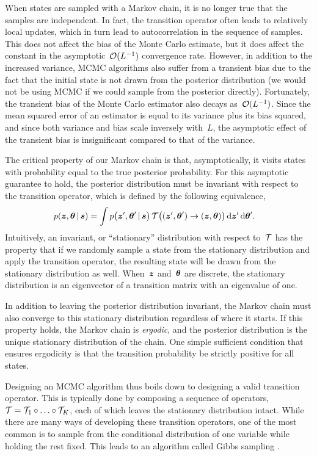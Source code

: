 When states are sampled with a Markov chain, it is no longer true that
the samples are independent. In fact, the transition operator often
leads to relatively local updates, which in turn lead to
autocorrelation in the sequence of samples. This does not affect the
bias of the Monte Carlo estimate, but it does affect the constant in the
asymptotic~$\mathcal{O}(L^{-1})$ convergence rate. However, in addition to
the increased variance, MCMC algorithms also suffer from a transient
bias due to the fact that the initial state is not drawn from the
posterior distribution (we would not be using MCMC if we could sample
from the posterior directly). Fortunately, the transient bias of the
Monte Carlo estimator also decays as~$\mathcal{O}(L^{-1})$. Since the mean
squared error of an estimator is equal to its variance plus its bias
squared, and since both variance and bias scale inversely with~$L$,
the asymptotic effect of the transient bias is insignificant compared
to that of the variance.

The critical property of our Markov chain is that, asymptotically, it
visits states with probability equal to the true posterior
probability.  For this asymptotic guarantee to hold, the posterior
distribution must be invariant with respect to the transition
operator, which is defined by the following equivalence,
\begin{align}
  \label{eq:invariance}
  p(\boldsymbol{z}, \boldsymbol{\theta} \,|\, \boldsymbol{s}) 
  &= \int  p \big(\boldsymbol{z}', \boldsymbol{\theta}' \,|\, \boldsymbol{s} \big) \,
    \mathcal{T} \big((\boldsymbol{z}', \boldsymbol{\theta}') \to (\boldsymbol{z}, \boldsymbol{\theta}) \big) \, 
    \mathrm{d}\boldsymbol{z}' \, \mathrm{d}\boldsymbol{\theta}'. 
\end{align}
Intuitively, an invariant, or ``stationary'' distribution with
respect to~$\mathcal{T}$ has the property that if we randomly sample a state
from the stationary distribution and apply the transition operator,
the resulting state will be drawn from the stationary distribution as
well. When~$\boldsymbol{z}$ and~$\boldsymbol{\theta}$ are discrete, the stationary
distribution is an eigenvector of a transition matrix with an eigenvalue
of one.

In addition to leaving the posterior distribution invariant, the
Markov chain must also converge to this stationary distribution
regardless of where it starts. If this property holds, the Markov
chain is \emph{ergodic}, and the posterior distribution is the unique
stationary distribution of the chain. One simple sufficient condition
that ensures ergodicity is that the transition probability be strictly
positive for all states.

Designing an MCMC algorithm thus boils down to designing a valid
transition operator. This is typically done by composing a sequence of
operators,~${\mathcal{T} = \mathcal{T}_1 \circ \ldots \circ \mathcal{T}_K}$, each of which
leaves the stationary distribution intact. While there are many ways
of developing these transition operators, one of the most common 
is to sample from the conditional distribution of one variable 
while holding the rest fixed. This leads to an algorithm called 
Gibbs sampling \citep{geman1984stochastic}.

